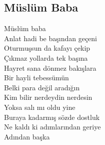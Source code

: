 \subsection{Müslüm Baba}

Müslüm baba \\
Anlat hadi be başından geçeni \\
Oturmuşsun da kafayı çekip \\
Çıkmaz yollarda tek başına \\

\noindent\newline
Hayret sana dönmez bakışlara \\
Bir hayli tebessümün \\
Belki para değil aradığın \\
Kim bilir nerdeydin nerdesin \\

\noindent\newline
Yoksa salı mı oldu yine \\
Buraya kadarmış sözde dostluk \\
Ne kaldı ki adımlarından geriye \\
Adından başka \\